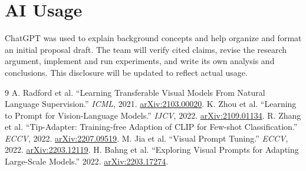 \documentclass[11pt,letterpaper]{article}
\begin{document}
\section{AI Usage}
ChatGPT was used to explain background concepts and help organize and format an initial proposal draft. The team will verify cited claims, revise the research argument, implement and run experiments, and write its own analysis and conclusions. This disclosure will be updated to reflect actual usage.

\begin{thebibliography}{9}
 A. Radford et al. ``Learning Transferable Visual Models From Natural Language Supervision.'' \textit{ICML}, 2021. \href{https://arxiv.org/abs/2103.00020}{arXiv:2103.00020}.
 K. Zhou et al. ``Learning to Prompt for Vision-Language Models.'' \textit{IJCV}, 2022. \href{https://arxiv.org/abs/2109.01134}{arXiv:2109.01134}.
 R. Zhang et al. ``Tip-Adapter: Training-free Adaption of CLIP for Few-shot Classification.'' \textit{ECCV}, 2022. \href{https://arxiv.org/abs/2207.09519}{arXiv:2207.09519}.
 M. Jia et al. ``Visual Prompt Tuning.'' \textit{ECCV}, 2022. \href{https://arxiv.org/abs/2203.12119}{arXiv:2203.12119}.
 H. Bahng et al. ``Exploring Visual Prompts for Adapting Large-Scale Models.'' 2022. \href{https://arxiv.org/abs/2203.17274}{arXiv:2203.17274}.
\end{thebibliography}
\end{document}
